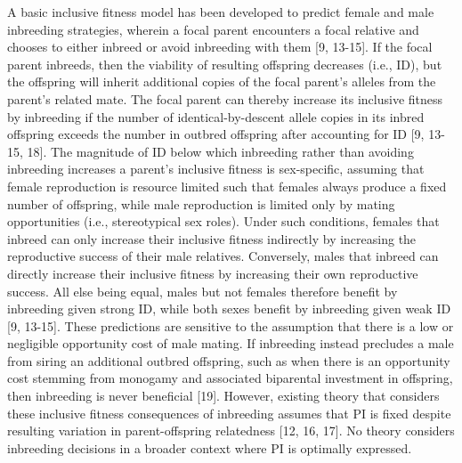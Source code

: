\documentclass[12pt]{article}
\begin{document}
A basic inclusive fitness model has been developed to predict female and male inbreeding strategies, wherein a focal parent encounters a focal relative and chooses to either inbreed or avoid inbreeding with them [9, 13-15]. If the focal parent inbreeds, then the viability of resulting offspring decreases (i.e., ID), but the offspring will inherit additional copies of the focal parent's alleles from the parent's related mate. The focal parent can thereby increase its inclusive fitness by inbreeding if the number of identical-by-descent allele copies in its inbred offspring exceeds the number in outbred offspring after accounting for ID [9, 13-15, 18]. The magnitude of ID below which inbreeding rather than avoiding inbreeding increases a parent's inclusive fitness is sex-specific, assuming that female reproduction is resource limited such that females always produce a fixed number of offspring, while male reproduction is limited only by mating opportunities (i.e., stereotypical sex roles). Under such conditions, females that inbreed can only increase their inclusive fitness indirectly by increasing the reproductive success of their male relatives. Conversely, males that inbreed can directly increase their inclusive fitness by increasing their own reproductive success. All else being equal, males but not females therefore benefit by inbreeding given strong ID, while both sexes benefit by inbreeding given weak ID [9, 13-15]. These predictions are sensitive to the assumption that there is a low or negligible opportunity cost of male mating. If inbreeding instead precludes a male from siring an additional outbred offspring, such as when there is an opportunity cost stemming from monogamy and associated biparental investment in offspring, then inbreeding is never beneficial [19]. However, existing theory that considers these inclusive fitness consequences of inbreeding assumes that PI is fixed despite resulting variation in parent-offspring relatedness [12, 16, 17]. No theory considers inbreeding decisions in a broader context where PI is optimally expressed.
\end{document}
